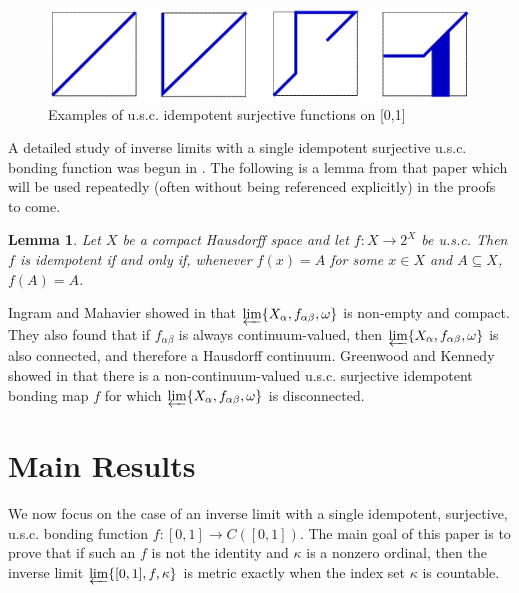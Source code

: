 \documentclass{amsart}
\newtheorem{lemma}[theorem]{Lemma}
\theoremstyle{definition}
\begin{document}
\begin{figure}
\begin{center}
\includegraphics[width=\linewidth]{idempotent_usc.pdf}
\end{center}
\caption{Examples of u.s.c. idempotent surjective functions on [0,1]}
\label{idempotentUsc}
\end{figure}

A detailed study of inverse limits with a single idempotent surjective u.s.c. bonding function was begun in \cite{varagona}. The following is a lemma from that paper which will be used repeatedly (often without being referenced explicitly) in the proofs to come.

\begin{lemma} \label{idemlemma}  Let $X$ be a compact Hausdorff space and let $f: X \rightarrow 2^{X}$ be u.s.c. Then $f$ is idempotent if and only if, whenever $f(x) = A$ for some $x \in X$ and $A \subseteq X$, $f(A) = A$.
\end{lemma}

Ingram and Mahavier showed in \cite{i m paper} that $\varprojlim \{X_{\alpha}, f_{\alpha \beta}, \omega\}$ is non-empty and compact. They also found that
if $f_{\alpha \beta}$ is always continuum-valued, then $\varprojlim \{X_{\alpha}, f_{\alpha \beta}, \omega\}$ is also connected, and therefore a Hausdorff continuum. Greenwood and Kennedy showed in \cite{greenwood kennedy} that there is a non-continuum-valued u.s.c. surjective idempotent bonding map $f$ for which $\varprojlim \{X_{\alpha}, f_{\alpha \beta}, \omega\}$ is disconnected.

\section{Main Results}

We now focus on the case of an inverse limit with a single idempotent, surjective, u.s.c. bonding function $f: [0,1] \rightarrow C([0,1])$. The main goal of this paper is to prove that if such an $f$ is not the identity and $\kappa$ is a nonzero ordinal, then the inverse limit $\varprojlim \{[0,1], f, \kappa\}$ is metric exactly when the index set $\kappa$ is countable.
\end{document}
